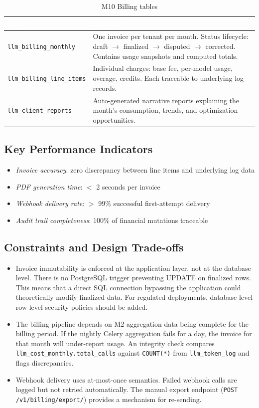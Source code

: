 \documentclass[12pt,a4paper,twoside]{report}
\newcommand{\kpi}[1]{\textit{\textcolor{accentgreen}{#1}}}
\begin{document}
\begin{table}[H]
\centering
\small
\begin{tabularx}{\textwidth}{|l|X|}
\hline
\rowcolor{tabheader}
\textcolor{white}{\textbf{Table}} &
\textcolor{white}{\textbf{Purpose}} \\
\hline
\texttt{llm\_billing\_monthly} & One invoice per tenant per month. Status lifecycle: draft $\rightarrow$ finalized $\rightarrow$ disputed $\rightarrow$ corrected. Contains usage snapshots and computed totals. \\
\hline
\texttt{llm\_billing\_line\_items} & Individual charges: base fee, per-model usage, overage, credits. Each traceable to underlying log records. \\
\hline
\texttt{llm\_client\_reports} & Auto-generated narrative reports explaining the month's consumption, trends, and optimization opportunities. \\
\hline
\end{tabularx}
\caption{M10 Billing tables}
\end{table}

\subsection{Key Performance Indicators}
\begin{itemize}
  \item \kpi{Invoice accuracy}: zero discrepancy between line items and underlying log data
  \item \kpi{PDF generation time}: $<$ 2 seconds per invoice
  \item \kpi{Webhook delivery rate}: $>$ 99\% successful first-attempt delivery
  \item \kpi{Audit trail completeness}: 100\% of financial mutations traceable
\end{itemize}

\subsection{Constraints and Design Trade-offs}
\begin{itemize}
  \item Invoice immutability is enforced at the application layer, not at the database level. There is no PostgreSQL trigger preventing UPDATE on finalized rows. This means that a direct SQL connection bypassing the application could theoretically modify finalized data. For regulated deployments, database-level row-level security policies should be added.
  \item The billing pipeline depends on M2 aggregation data being complete for the billing period. If the nightly Celery aggregation fails for a day, the invoice for that month will under-report usage. An integrity check compares \texttt{llm\_cost\_monthly.total\_calls} against \texttt{COUNT(*)} from \texttt{llm\_token\_log} and flags discrepancies.
  \item Webhook delivery uses at-most-once semantics. Failed webhook calls are logged but not retried automatically. The manual export endpoint (\texttt{POST /v1/billing/export/}) provides a mechanism for re-sending.
\end{itemize}
\end{document}
